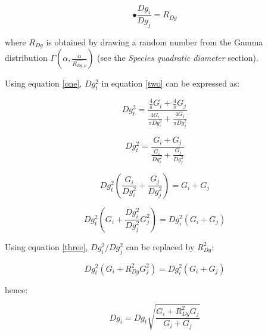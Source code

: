 \documentclass[a4paper]{article}
\begin{document}
\begin{equation}\label{three}\tag{c}
  \bullet \frac{Dg_i}{Dg_j} = R_{Dg}
\end{equation}

\noindent where $R_{Dg}$ is obtained by drawing a random number from the Gamma distribution $\Gamma(\alpha, \frac{\alpha}{\widehat{R_{Dg, p}}})$ (see the \textit{Species quadratic diameter} section).

\hfill

\noindent Using equation \ref{one}, $Dg_t^2$ in equation \ref{two} can be expressed as:

\begin{equation*}\label{}
  Dg_t^2 = \frac{\frac{4}{\pi}G_i + \frac{4}{\pi}G_j}{\frac{4G_i}{\pi Dg_i^2} + \frac{4G_j}{\pi Dg_j^2}}
\end{equation*}

\begin{equation*}\label{}
  Dg_t^2 = \frac{G_i + G_j} {\frac{G_i}{Dg_i^2} + \frac{G_j}{Dg_j^2}}
\end{equation*}

\begin{equation*}\label{}
  Dg_t^2(\frac{G_i}{Dg_i^2} + \frac{G_j}{Dg_j^2})= G_i + G_j
\end{equation*}

\begin{equation*}\label{}
  Dg_t^2(G_i + \frac{Dg_i^2}{Dg_j^2}G_j^2)= Dg_i^2(G_i + G_j)
\end{equation*}

\noindent Using equation \ref{three}, $Dg_i^2 / Dg_j^2$ can be replaced by $R_{Dg}^2$:

\begin{equation*}\label{}
  Dg_t^2(G_i + R_{Dg}^2G_j^2)= Dg_i^2(G_i + G_j)
\end{equation*}

\noindent hence:

\begin{equation*}\label{}
  Dg_i = Dg_t\sqrt{\frac{G_i + R_{Dg}^2G_j}{G_i + G_j}}
\end{equation*}
\end{document}
